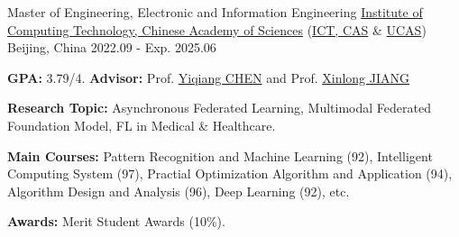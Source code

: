 
\begin{cventries}

\cventry
{Master of Engineering, Electronic and Information Engineering} %
{\href{http://www.ict.cas.cn/}{Institute of Computing Technology, Chinese Academy of Sciences} (\href{http://www.ict.cas.cn/}{ICT, CAS} \& \href{https://www.ucas.ac.cn/}{UCAS})} %
{Beijing, China} %
{2022.09 - Exp. 2025.06} %
{
  \begin{cvitems} %
    \item {\textbf{GPA:} 3.79/4. \textbf{Advisor:} Prof. \href{https://scholar.google.com/citations?user=LC3SwhEAAAAJ&hl=en&oi=ao}{Yiqiang CHEN} and Prof. \href{https://scholar.google.com/citations?user=zMyg3vcAAAAJ&hl=en&oi=ao}{Xinlong JIANG}}
    \item {\textbf{Research Topic:} Asynchronous Federated Learning, Multimodal Federated Foundation Model, FL in Medical \& Healthcare.} %
    \item {\textbf{Main Courses:} Pattern Recognition and Machine Learning (92), Intelligent Computing System (97), Practial Optimization Algorithm and Application (94), Algorithm Design and Analysis (96), Deep Learning (92), etc.}
    \item {\textbf{Awards:} Merit Student Awards (10\%).}
  \end{cvitems}
}


\end{cventries}
